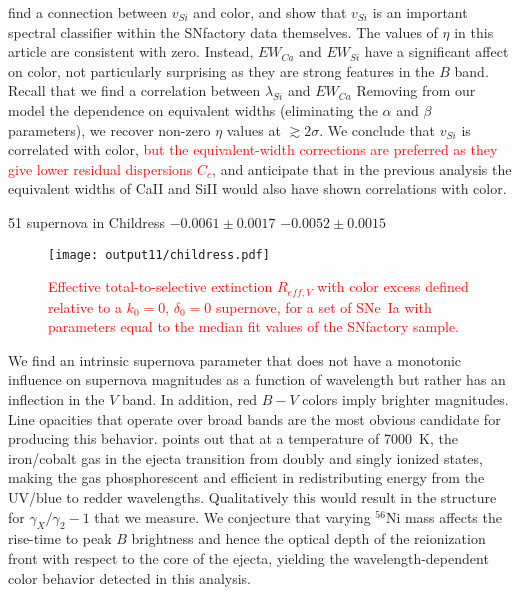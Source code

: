 \documentclass{aastex}   	%
\begin{document}
\citet{2009ApJ...699L.139W, 2011ApJ...729...55F} find a connection between $v_{Si}$ and color, and  
\citet{2015MNRAS.447.1247S} show that $v_{Si}$ is an important spectral classifier within the SNfactory data themselves.
The values of $\eta$ in this article are consistent with zero. Instead,  $EW_{Ca}$ and $EW_{Si}$ have a significant affect on color, not particularly 
surprising as they
are strong features in the $B$ band.
Recall that we find a correlation between $\lambda_{Si}$ and $EW_{Ca}$
Removing from our model the dependence on equivalent widths (eliminating the  $\alpha$ and $\beta$ parameters), we recover
non-zero $\eta$ values at  $\gtrsim 2\sigma$.  We conclude that $v_{Si}$ is correlated with color, 
\textcolor{red}{but the equivalent-width corrections are preferred as they give lower residual dispersions $C_c$},
and  anticipate that in the previous analysis the equivalent widths of CaII and 
SiII would also have shown correlations with color.


51 supernova in Childress
$  -0.0061 \pm    0.0017$
$  -0.0052 \pm    0.0015$

\begin{figure}[htbp] %
   \centering
   \texttt{[image: output11/childress.pdf]}
      \caption{\textcolor{red}{Effective total-to-selective extinction $R_{eff, V}$
      with color excess defined relative to  a
      $k_0=0$, $\delta_0=0$ supernove,  for  a set of SNe~Ia  with parameters equal to the median fit values of the SNfactory sample.}
   \label{childress:fig}}
\end{figure}

We find an intrinsic supernova parameter that does not have a monotonic influence on supernova magnitudes as a function
of wavelength but rather has an inflection in the $V$ band.  In addition, red $B-V$ colors imply brighter magnitudes.  Line opacities
that operate over broad bands are the most obvious candidate for producing this behavior.
\citet{2006ApJ...649..939K} points out that at a temperature of 7000~K, the iron/cobalt gas in the ejecta transition
from doubly and singly ionized states, making the gas phosphorescent and efficient in redistributing energy from the UV/blue to redder
wavelengths.  Qualitatively this would result in the structure for $\gamma_X/\gamma_2-1$ that we measure.
We conjecture that varying $^{56}$Ni mass affects the rise-time to peak $B$ brightness and hence the optical depth
of the reionization front with respect to the core of the ejecta, yielding the wavelength-dependent color behavior
detected in this analysis.
\end{document}
